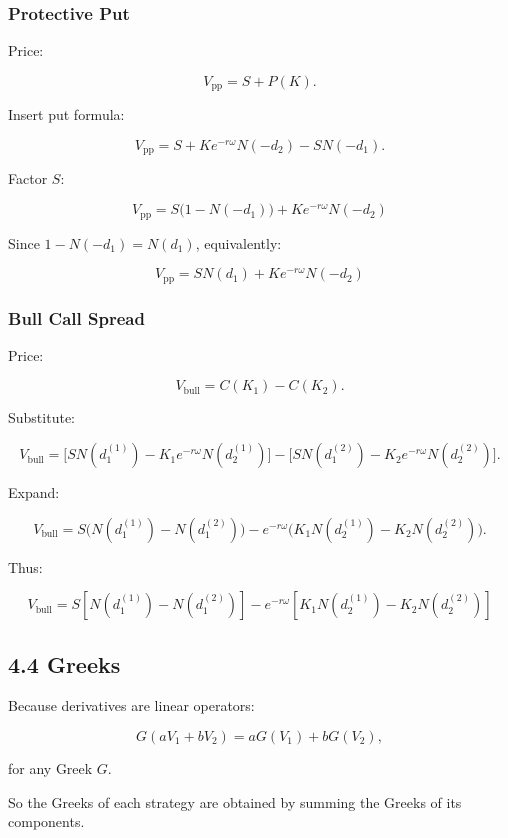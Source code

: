 \documentclass[11pt]{article}
\begin{document}
\subsubsection*{Protective Put}

Price:

\[
V_{\text{pp}}=S+P(K).
\]

Insert put formula:

\[
V_{\text{pp}}
=
S+Ke^{-r\omega}N(-d_2)-SN(-d_1).
\]

Factor $S$:

\[
\boxed{
V_{\text{pp}}
=
S\big(1-N(-d_1)\big)+Ke^{-r\omega}N(-d_2)
}
\]

Since $1-N(-d_1)=N(d_1)$, equivalently:

\[
\boxed{
V_{\text{pp}}=SN(d_1)+Ke^{-r\omega}N(-d_2)
}
\]

\subsubsection*{Bull Call Spread}

Price:

\[
V_{\text{bull}}=C(K_1)-C(K_2).
\]

Substitute:

\[
V_{\text{bull}}
=
\big[S N(d_1^{(1)})-K_1e^{-r\omega}N(d_2^{(1)})\big]
-
\big[S N(d_1^{(2)})-K_2e^{-r\omega}N(d_2^{(2)})\big].
\]

Expand:

\[
V_{\text{bull}}
=
S\big(N(d_1^{(1)})-N(d_1^{(2)})\big)
-
e^{-r\omega}
\big(K_1N(d_2^{(1)})-K_2N(d_2^{(2)})\big).
\]

Thus:

\[
\boxed{
V_{\text{bull}}
=
S\left[N(d_1^{(1)})-N(d_1^{(2)})\right]
-
e^{-r\omega}
\left[K_1N(d_2^{(1)})-K_2N(d_2^{(2)})\right]
}
\]

\subsection*{4.4 Greeks}

Because derivatives are linear operators:

\[
G(aV_1+bV_2)=aG(V_1)+bG(V_2),
\]

for any Greek $G$.

So the Greeks of each strategy are obtained by summing the Greeks of its components.
\end{document}
